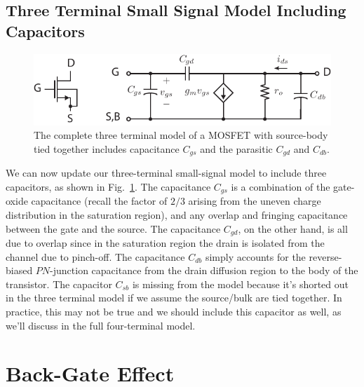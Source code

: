\subsection{Three Terminal Small Signal Model Including Capacitors}
\begin{figure}[tb]
\centering
\includegraphics[scale=1]{mos3term_ac}
\caption{The complete three terminal model of a MOSFET with source-body tied together includes  capacitance $C_{gs}$ and the parasitic $C_{gd}$ and $C_{db}$.}
\label{fig:mos3term_ac}
\end{figure}
We can now update our three-terminal small-signal model to include three capacitors, as shown in Fig.~\ref{fig:mos3term_ac}.  The capacitance $C_{gs}$ is a combination of the gate-oxide capacitance (recall the factor of $2/3$ arising from the uneven charge distribution in the saturation region), and any overlap and fringing capacitance between the gate and the source.  The capacitance $C_{gd}$, on the other hand, is all due to overlap since in the saturation region the drain is isolated from the channel due to pinch-off.  The capacitance $C_{db}$ simply accounts for the reverse-biased $PN$-junction capacitance from the drain diffusion region to the body of the transistor.  The capacitor $C_{sb}$ is missing from the model because it's shorted out in the three terminal model if we assume the source/bulk are tied together.  In practice, this may not be true and we should include this capacitor as well, as we'll discuss in the full four-terminal model.  
\section{Back-Gate Effect}
